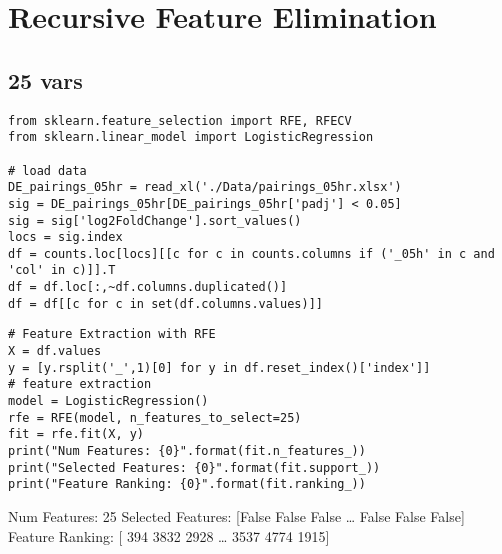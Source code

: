 \documentclass[a4paper]{article}
\begin{document}
\section{Recursive Feature Elimination}
\label{sec:org8a8f50e}

\subsection{25 vars}
\label{sec:org3e8da90}
\begin{verbatim}
from sklearn.feature_selection import RFE, RFECV
from sklearn.linear_model import LogisticRegression

# load data
DE_pairings_05hr = read_xl('./Data/pairings_05hr.xlsx')
sig = DE_pairings_05hr[DE_pairings_05hr['padj'] < 0.05]
sig = sig['log2FoldChange'].sort_values()
locs = sig.index
df = counts.loc[locs][[c for c in counts.columns if ('_05h' in c and 'col' in c)]].T
df = df.loc[:,~df.columns.duplicated()]
df = df[[c for c in set(df.columns.values)]]
\end{verbatim}

\begin{verbatim}
# Feature Extraction with RFE
X = df.values
y = [y.rsplit('_',1)[0] for y in df.reset_index()['index']]
# feature extraction
model = LogisticRegression()
rfe = RFE(model, n_features_to_select=25)
fit = rfe.fit(X, y)
print("Num Features: {0}".format(fit.n_features_))
print("Selected Features: {0}".format(fit.support_))
print("Feature Ranking: {0}".format(fit.ranking_))
\end{verbatim}

Num Features: 25
Selected Features: [False False False \ldots{} False False False]
Feature Ranking: [ 394 3832 2928 \ldots{} 3537 4774 1915]
\end{document}
